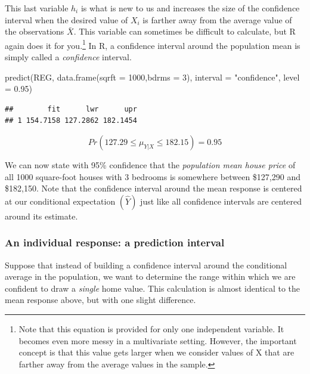 \documentclass[
]{book}
\newenvironment{Shaded}{\begin{snugshade}}{\end{snugshade}}
\newcommand{\AttributeTok}[1]{\textcolor[rgb]{0.77,0.63,0.00}{#1}}
\newcommand{\DecValTok}[1]{\textcolor[rgb]{0.00,0.00,0.81}{#1}}
\newcommand{\FloatTok}[1]{\textcolor[rgb]{0.00,0.00,0.81}{#1}}
\newcommand{\FunctionTok}[1]{\textcolor[rgb]{0.00,0.00,0.00}{#1}}
\newcommand{\NormalTok}[1]{#1}
\newcommand{\StringTok}[1]{\textcolor[rgb]{0.31,0.60,0.02}{#1}}
\begin{document}
This last variable \(h_i\) is what is new to us and increases the size of the confidence interval when the desired value of \(X_i\) is farther away from the average value of the observations \(\bar{X}\). This variable can sometimes be difficult to calculate, but R again does it for you.\footnote{Note that this equation is provided for only one independent variable. It becomes even more messy in a multivariate setting. However, the important concept is that this value gets larger when we consider values of X that are farther away from the average values in the sample.} In R, a confidence interval around the population mean is simply called a \emph{confidence} interval.

\begin{Shaded}
\begin{Highlighting}[]
\FunctionTok{predict}\NormalTok{(REG,}
        \FunctionTok{data.frame}\NormalTok{(}\AttributeTok{sqrft =} \DecValTok{1000}\NormalTok{,}\AttributeTok{bdrms =} \DecValTok{3}\NormalTok{), }
        \AttributeTok{interval =} \StringTok{"confidence"}\NormalTok{,}
        \AttributeTok{level =} \FloatTok{0.95}\NormalTok{)}
\end{Highlighting}
\end{Shaded}

\begin{verbatim}
##        fit      lwr      upr
## 1 154.7158 127.2862 182.1454
\end{verbatim}

\[Pr(127.29\leq\mu_{Y|X}\leq182.15)=0.95\]

We can now state with 95\% confidence that the \emph{population mean house price} of all 1000 square-foot houses with 3 bedrooms is somewhere between \$127,290 and \$182,150. Note that the confidence interval around the mean response is centered at our conditional expectation \((\hat{Y})\) just like all confidence intervals are centered around its estimate.

\hypertarget{an-individual-response-a-prediction-interval-1}{%
\subsubsection*{An individual response: a prediction interval}\label{an-individual-response-a-prediction-interval-1}}

Suppose that instead of building a confidence interval around the conditional average in the population, we want to determine the range within which we are confident to draw a \emph{single} home value. This calculation is almost identical to the mean response above, but with one slight difference.
\end{document}
